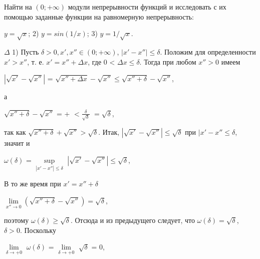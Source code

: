\documentclass[12pt]{article}
\begin{document}
 Найти на $(0;+\infty)$ модули непрерывности функций и исследовать с их помощью заданные функции на равномерную непрерывность: 

\quad $y=\sqrt{x}$;  2) $y = sin(1/x)$; 3) $y = 1/\sqrt{x}$. 

\quad  $\Delta$ 1) Пусть $\delta > 0, x', x'' \in (0;+\infty)$, $|x' - x''| \leq \delta$. Положим для определенности $x' > x''$, т. е. $x' = x'' + \Delta x$, где 0 < $\Delta x \leq \delta$. Тогда при любом $x'' > 0$ имеем 
\begin{center}
    $|\sqrt{x'} - \sqrt{x''}| $ = $\sqrt{x'' + \Delta x} - \sqrt{x''} \leq \sqrt{x'' + \delta} - \sqrt{x''}$,
\end{center}
а
\begin{center}
    $\sqrt{x'' + \delta} - \sqrt{x''}$ = \frac{\delta} {+} $< \frac{\delta}{\sqrt{\delta}}$ $ = \sqrt{\delta}$, 

\end{center}
так как $\sqrt{x'' + \delta} + \sqrt{x''} > \sqrt{\delta}$. Итак, $|\sqrt{x'} - \sqrt{x''}| \leq \sqrt{\delta}$ при $|x' - x'' \leq \delta$, значит и
\begin{center}
    $\omega(\delta)$ = $\sup\limits_{|x'-x''| \leq \delta} $ $|\sqrt{x'} - \sqrt{x''}| \leq \sqrt{\delta}$,


\end{center}
В то же время при $x' = x'' + \delta$
\begin{center}
   $\lim\limits_{x'' \to 0} $$(\sqrt{x''+\delta}-\sqrt{x''})=\sqrt{\delta}$,

\end{center}
поэтому $\omega(\delta) \geq \sqrt{\delta}$. Отсюда и из предыдущего следует, что $\omega(\delta) = \sqrt{\delta}$, $\delta > 0$. Поскольку
\begin{center}
    $\lim\limits_{\delta \to +0}$ $\omega(\delta)$ = $\lim\limits_{\delta \to +0}$ $\sqrt{\delta}$ = 0,
\end{center}
\end{document}
